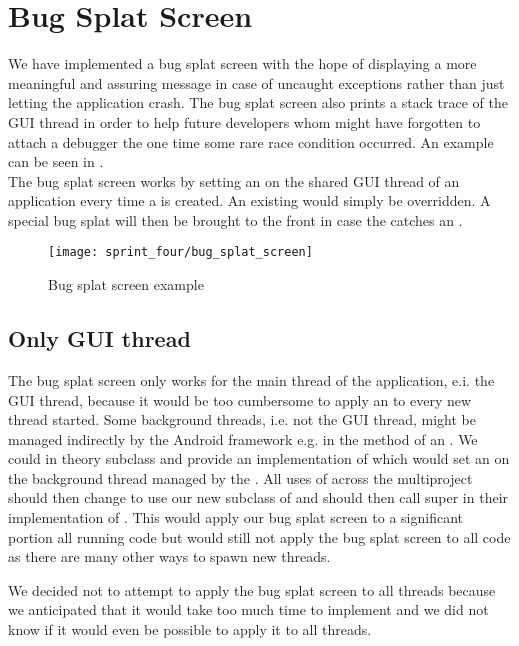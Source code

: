 
\section{Bug Splat Screen}
\label{sec:bug_splat_screen}

We have implemented a bug splat screen with the hope of displaying a more meaningful and assuring message in case of uncaught exceptions rather than just letting the application crash. The bug splat screen also prints a stack trace of the GUI thread in order to help future developers whom might have forgotten to attach a debugger the one time some rare race condition occurred. An example can be seen in .\\

The bug splat screen works by setting an  on the shared GUI thread of an application every time a  is created. An existing  would simply be overridden. A special bug splat  will then be brought to the front in case the  catches an .

\begin{figure}[!htbp]
        \centering
        \texttt{[image: sprint\_four/bug\_splat\_screen]}
        \caption{Bug splat screen example}
        \label{fig:bug_splat_screen_example}
\end{figure}

\subsection{Only GUI thread} 
The bug splat screen only works for the main thread of the application, e.i. the GUI thread, because it would be too cumbersome to apply an  to every new thread started. Some background threads, i.e. not the GUI thread, might be managed indirectly by the Android framework e.g. in the  method of an . We could in theory subclass  and provide an implementation of  which would set an  on the background thread managed by the . All uses of  across the \giraf multiproject should then change to use our new subclass of  and should then call super in their implementation of . This would apply our bug splat screen to a significant portion all running code but would still not apply the bug splat screen to all code as there are many other ways to spawn new threads. 

We decided not to attempt to apply the bug splat screen to all threads because we anticipated that it would take too much time to implement and we did not know if it would even be possible to apply it to all threads.          
